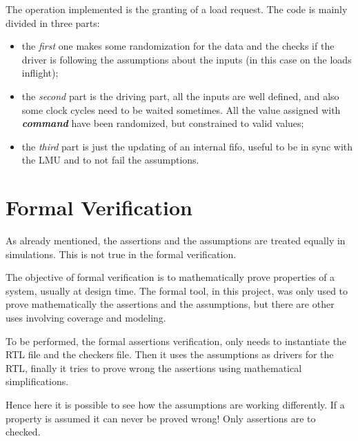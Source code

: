 The operation implemented is the granting of a load request. The code is mainly divided in three parts: 
\begin{itemize}
    \item the \emph{first} one makes some randomization for the data and the checks if the driver is following the assumptions about the inputs (in this case on the loads inflight);
    
    \item the \emph{second} part is the driving part, all the inputs are well defined, and also some clock cycles need to be waited sometimes. All the value assigned with \textbf{\emph{command}} have been randomized, but constrained to valid values;
    
    \item the \emph{third} part is just the updating of an internal fifo, useful to be in sync with the LMU and to not fail the assumptions.
\end{itemize}  
\bigskip






\section{Formal Verification}
As already mentioned, the assertions and the assumptions are treated equally in simulations. This is not true in the formal verification.

The objective of formal veriﬁcation is to mathematically prove properties of a system, usually at design time\cite{verification-book-2018-formal}.
The formal tool, in this project, was only used to prove mathematically the assertions and the assumptions, but there are other uses involving coverage and modeling.

To be performed, the formal assertions verification, only needs to instantiate the RTL file and the checkers file. Then it uses the assumptions as drivers for the RTL, finally it tries to prove wrong the assertions using mathematical simplifications.

Hence here it is possible to see how the assumptions are working differently. If a property is assumed it can never be proved wrong! Only assertions are to checked.

